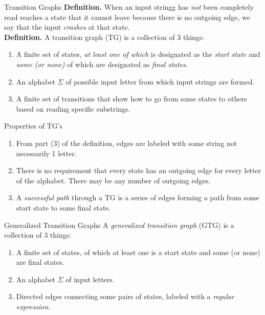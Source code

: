 \documentclass{article}
\begin{document}
\begin{multicols*}{3}
\begin{blackbox}{Transition Graphs}
    \textbf{Definition.} When an input stringg has \emph{not} been completely read reaches a state that it cannot leave because there is no outgoing edge, we say that the input \emph{crashes} at that state.\\
    \textbf{Definition.} A transition graph (TG) is a collection of 3 things: 
    \begin{enumerate}[leftmargin=0.5cm,itemsep=0.25ex]
        \item A finite set of states, \emph{at least one of which} is designated as the \emph{start state} and \emph{some (or none)} of which are designated as \emph{final states}.
        \item An alphabet $\Sigma$ of possible input letter from which input strings are formed.
        \item A finite set of transitions that show how to go from some states to others based on reading specific substrings.
    \end{enumerate}
    \begin{brownbox}{Properties of TG's}
        \begin{enumerate}[leftmargin=0.5cm, itemsep=0.25ex]
            \item From part (3) of the definition, edges are labeled with some string not necessarily 1 letter.
            \item There is no requirement that every state has an outgoing edge for every letter of the alphabet. There may be any number of outgoing edges.
            \item A \emph{successful path} through a TG is a series of edges forming a path from some start state to some final state.
        \end{enumerate}
    \end{brownbox}
    \begin{redbox}{Generalized Transition Graphs}
        A \emph{generalized transition graph} (GTG) is a collection of 3 things:
        \begin{enumerate}[leftmargin=0.5cm]
            \item A finite set of states, of which at least one is a start state and some (or none) are final states.
            \item An alphabet $\Sigma$ of input letters.
            \item Directed edges connecting some pairs of states, labeled with a \emph{regular expression}.
        \end{enumerate}

\end{redbox}
\end{blackbox}
\end{multicols*}
\end{document}
